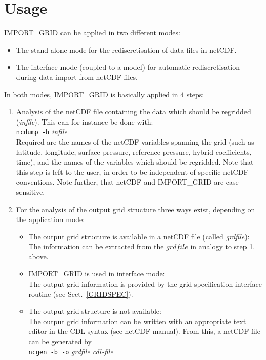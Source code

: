 \documentclass[11pt,twoside]{report}
\begin{document}
\section{Usage}
IMPORT\_GRID can be applied in two different modes:
\begin{itemize}
\item The stand-alone mode for the rediscretisation of data files in netCDF.
\item The interface mode (coupled to a model) for automatic rediscretisation
 during  data import from netCDF files.
\end{itemize}
In both modes, IMPORT\_GRID is basically applied in 4 steps:
\begin{enumerate}
\item Analysis of the netCDF file containing the data which should be regridded
({\it infile}). This can for instance be done with:\\
\verb|ncdump -h| {\it infile}\\
Required are the names of the netCDF variables spanning the grid (such as
latitude, longitude, surface pressure, reference pressure, hybrid-coefficients,
time), and the names of the variables which should be regridded. Note that
this step is left to the user, in order to be independent of specific netCDF
conventions. Note further, that netCDF and IMPORT\_GRID are case-sensitive.
\item For the analysis of the output grid structure three ways exist, depending
on the application mode:
\begin{itemize}
\item The output grid structure is available in a netCDF file (called {\it grdfile}):\\
The information can be extracted from the $grdfile$ in analogy to step 1. above.
\item IMPORT\_GRID is used in interface mode:\\
The output grid information is provided by the grid-specification interface
routine (see Sect.~\ref{GRIDSPEC}).
\item The output grid structure is not available:\\
The output grid information can be written with an appropriate text
editor in the CDL-syntax (see netCDF manual). From this, a netCDF
file can be generated by \\
\verb|ncgen -b -o| {\it grdfile cdl-file}\\

\end{itemize}
\end{enumerate}
\end{document}
